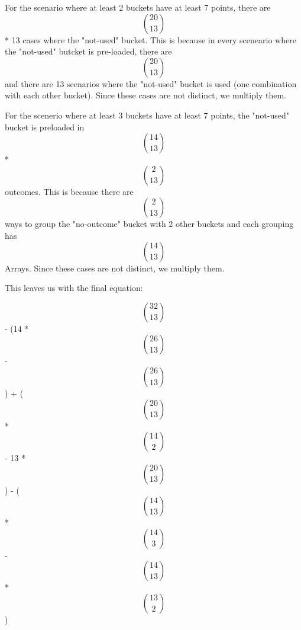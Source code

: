\documentclass{article}
\begin{document}
For the scenario where at least 2 buckets have at least 7 points, there are 
\[20 \choose 13\] * 13 cases where the "not-used" bucket. This is because in every sceneario where the "not-used" butcket is pre-loaded, there are \[20 \choose 13\] and there are 13 scenarios where the "not-used" bucket is used (one combination with each other bucket). Since these cases are not distinct, we multiply them.

For the scenerio where at least 3 buckets have at least 7 points, the "not-used" bucket is preloaded in \[14 \choose 13\] * \[2 \choose 13\] outcomes. This is because there are \[2 \choose 13\] ways to group the "no-outcome" bucket with 2 other buckets and each grouping has \[14 \choose 13\] Arrays. Since these cases are not distinct, we multiply them.

This leaves us with the final equation:

\[32 \choose 13\] - (14 * \[26 \choose 13\] - \[26 \choose 13\]) + (\[20 \choose 13\] * \[14 \choose 2\] - 13 * \[20 \choose 13\]) - (\[14 \choose 13\] * \[14 \choose 3\] - \[14 \choose 13\] * \[13 \choose 2\])
\end{document}
